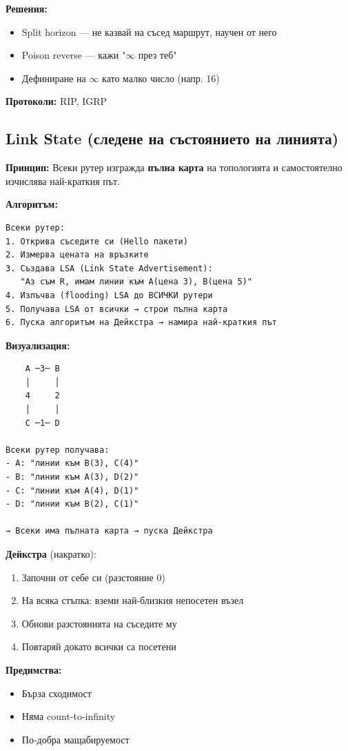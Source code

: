 \documentclass[12pt,a4paper]{article}
\begin{document}
\textbf{Решения:}
\begin{itemize}
    \item Split horizon — не казвай на съсед маршрут, научен от него
    \item Poison reverse — кажи "$\infty$ през теб"
    \item Дефиниране на $\infty$ като малко число (напр. 16)
\end{itemize}

\textbf{Протоколи:} RIP, IGRP

\subsection{Link State (следене на състоянието на линията)}

\textbf{Принцип:} Всеки рутер изгражда \textbf{пълна карта} на топологията и самостоятелно изчислява най-краткия път.

\textbf{Алгоритъм:}

\begin{lstlisting}
Всеки рутер:
1. Открива съседите си (Hello пакети)
2. Измерва цената на връзките
3. Създава LSA (Link State Advertisement):
   "Аз съм R, имам линии към A(цена 3), B(цена 5)"
4. Излъчва (flooding) LSA до ВСИЧКИ рутери
5. Получава LSA от всички → строи пълна карта
6. Пуска алгоритъм на Дейкстра → намира най-краткия път
\end{lstlisting}

\textbf{Визуализация:}

\begin{lstlisting}
    A ─3─ B
    │     │
    4     2
    │     │
    C ─1─ D

Всеки рутер получава:
- A: "линии към B(3), C(4)"
- B: "линии към A(3), D(2)"
- C: "линии към A(4), D(1)"
- D: "линии към B(2), C(1)"

→ Всеки има пълната карта → пуска Дейкстра
\end{lstlisting}

\textbf{Дейкстра} (накратко):
\begin{enumerate}
    \item Започни от себе си (разстояние 0)
    \item На всяка стъпка: вземи най-близкия непосетен възел
    \item Обнови разстоянията на съседите му
    \item Повтаряй докато всички са посетени
\end{enumerate}

\textbf{Предимства:}
\begin{itemize}
    \item[$\checkmark$] Бърза сходимост
    \item[$\checkmark$] Няма count-to-infinity
    \item[$\checkmark$] По-добра мащабируемост
\end{itemize}
\end{document}
